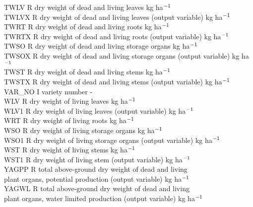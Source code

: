 \documentclass[11pt]{article}
\begin{document}
\begin{tabbing}
TWLV\> \> R\> dry weight of dead and living leaves\> \> \> \> \> \> \> kg ha$^{{\rm -1}}$\\
TWLVX\> \> R\> dry weight of dead and living leaves (output variable)\> \> \> \> \> \> \> kg ha$^{{\rm -1}}$\\
TWRT\> \> R\> dry weight of dead and living roots \> \> \> \> \> \> \> kg ha$^{{\rm -1}}$\\
TWRTX\> \> R\> dry weight of dead and living roots (output variable)\> \> \> \> \> \> \> kg ha$^{{\rm -1}}$\\
TWSO\> \> R\> dry weight of dead and living storage organs\> \> \> \> \> \> \> kg ha$^{{\rm -1}}$\\
TWSOX\> \> R\> dry weight of dead and living storage organs (output variable)\> \> \> \> \> \> \> kg ha$^{{\rm -1}}$\\
TWST\> \> R\> dry weight of dead and living stems \> \> \> \> \> \> \> kg ha$^{{\rm -1}}$\\
TWSTX\> \> R\> dry weight of dead and living stems (output variable)\> \> \> \> \> \> \> kg ha$^{{\rm -1}}$\\
VAR\_NO\> \> I\> variety number\> \> \> \> \> \> \> -\\
WLV\> \> R\> dry weight of living leaves\> \> \> \> \> \> \> kg ha$^{{\rm -1}}$\\
WLV1\> \> R\> dry weight of living leaves (output variable)\> \> \> \> \> \> \> kg ha$^{{\rm -1}}$\\
WRT     \> \> R   \> dry weight of living roots                         \> \> \> \> \> \> \> kg ha$^{{\rm -1}}$\\
WSO     \> \> R   \> dry weight of living storage organs                \> \> \> \> \> \> \> kg ha$^{{\rm -1}}$\\
WSO1\> \> R\> dry weight of living storage organs (output variable)\> \> \> \> \> \> \> kg ha$^{{\rm -1}}$\\
WST\> \> R   \> dry weight of living stems              \> \> \> \> \> \> \> kg ha$^{{\rm -1}}$\\
WST1\> \> R\> dry weight of living stem (output variable)\> \> \> \> \> \> \> kg ha$^{{\rm -1}}$\\
YAGPP\> \> R\> total above-ground dry weight of dead and living\\
\>\> \> plant organs, potential production (output variable)\> \> \> \> \> \> \> kg ha$^{{\rm -1}}$\\
YAGWL\> \> R\> total above-ground dry weight of dead and living\\
\>\> \> plant organs, water limited production (output variable)\> \> \> \> \> \> \> kg ha$^{{\rm -1}}$\\

\end{tabbing}
\end{document}
